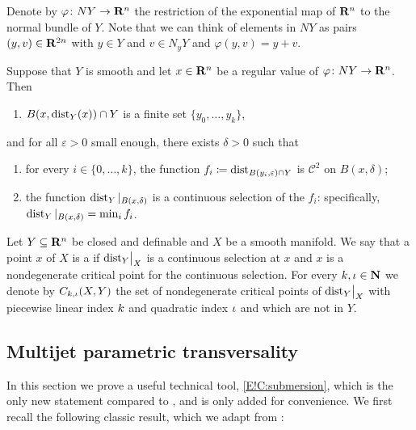 Denote by $\varphi \colon NY \to \mathbf{R}^n$ the restriction of the exponential map of $\mathbf{R}^n$ to the normal bundle of $Y$. Note that we can think of elements in $NY$ as pairs $(y, v) \in \mathbf{R}^{2n}$ with $y \in Y$ and $v \in N_y Y$ and $\varphi(y, v) = y + v.$

\begin{proposition}
\label{E!P:regular-value}
  Suppose that $Y$ is smooth and let $x \in \mathbf{R}^n$ be a regular value of $\varphi \colon NY \to \mathbf{R}^n$. Then
  \begin{enumerate}
  \item
    $B(x, \operatorname{dist}_Y(x)) \cap Y$ is a finite set $\{y_0, \ldots, y_k\}$,
  \end{enumerate}
  and for all $\varepsilon > 0$ small enough, there exists $\delta >0$ such that
  \begin{enumerate}[resume]
  \item
    for every $i \in \{0, \ldots, k\}$, the function $f_i \coloneq \operatorname{dist}_{B(y_i, \varepsilon) \cap Y}$ is $\mathcal{C}^2$ on $B(x, \delta)$;
  \item
    the function $\operatorname{dist}_Y|_{B(x, \delta)}$ is a continuous selection of the $f_i$: specifically, $\operatorname{dist}_Y|_{B(x, \delta)} = \min_i f_i$.
  \end{enumerate}
\end{proposition}

\begin{definition}
\label{E!def:setnondegcritpts}
  Let $Y \subseteq \mathbf{R}^n$ be closed and definable and $X$ be a smooth manifold. We say that a point $x$ of $X$ is a  if $\mathord{\operatorname{dist}}_Y\big|_X$ is a continuous selection at $x$ and $x$ is a nondegenerate critical point for the continuous selection. For every $k, \iota \in \mathbf{N}$ we denote by $C_{k, \iota}(X,Y)$ the set of nondegenerate critical points of $\mathord{\operatorname{dist}}_Y\big|_X$ with piecewise linear index $k$ and quadratic index $\iota$ and which are not in $Y$.
\end{definition}

\subsection{Multijet parametric transversality}

In this section we prove a useful technical tool, \cref{E!C:submersion}, which is the only new statement compared to \cite[Section 4.1]{GLRS2025}, and is only added for convenience. We first recall the following classic result, which we adapt from \cite[Chapter 3, Theorem 2.7]{Hirsch1976}:

